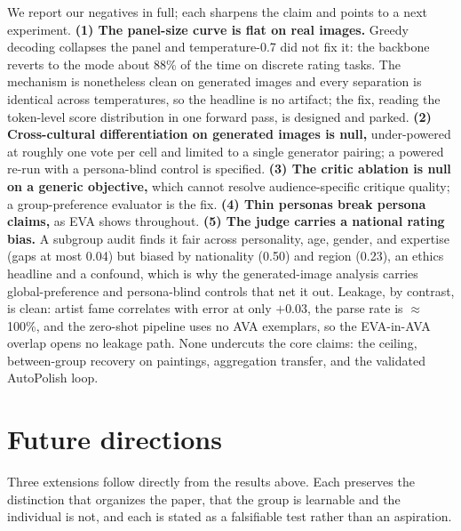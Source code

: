 \documentclass{article}
\begin{document}
We report our negatives in full; each sharpens the claim and points to a next experiment. \textbf{(1) The panel-size curve is flat on real images.} Greedy decoding collapses the panel and temperature-0.7 did not fix it: the backbone reverts to the mode about 88\% of the time on discrete rating tasks. The mechanism is nonetheless clean on generated images and every separation is identical across temperatures, so the headline is no artifact; the fix, reading the token-level score distribution in one forward pass, is designed and parked. \textbf{(2) Cross-cultural differentiation on generated images is null,} under-powered at roughly one vote per cell and limited to a single generator pairing; a powered re-run with a persona-blind control is specified. \textbf{(3) The critic ablation is null on a generic objective,} which cannot resolve audience-specific critique quality; a group-preference evaluator is the fix. \textbf{(4) Thin personas break persona claims,} as EVA shows throughout. \textbf{(5) The judge carries a national rating bias.} A subgroup audit \citep{aesbiasbench2025} finds it fair across personality, age, gender, and expertise (gaps at most 0.04) but biased by nationality (0.50) and region (0.23), an ethics headline and a confound, which is why the generated-image analysis carries global-preference and persona-blind controls that net it out. Leakage, by contrast, is clean: artist fame correlates with error at only $+0.03$, the parse rate is $\approx$100\%, and the zero-shot pipeline uses no AVA exemplars, so the EVA-in-AVA overlap opens no leakage path. None undercuts the core claims: the ceiling, between-group recovery on paintings, aggregation transfer, and the validated AutoPolish loop.


\section{Future directions}
\label{sup:future}
Three extensions follow directly from the results above. Each preserves the distinction that organizes the paper, that the group is learnable and the individual is not, and each is stated as a falsifiable test rather than an aspiration.
\end{document}
